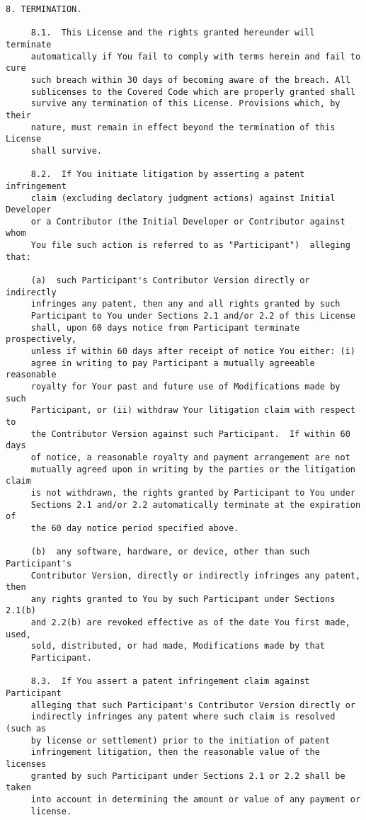 \begin{verbatim}
8. TERMINATION.

     8.1.  This License and the rights granted hereunder will terminate
     automatically if You fail to comply with terms herein and fail to cure
     such breach within 30 days of becoming aware of the breach. All
     sublicenses to the Covered Code which are properly granted shall
     survive any termination of this License. Provisions which, by their
     nature, must remain in effect beyond the termination of this License
     shall survive.

     8.2.  If You initiate litigation by asserting a patent infringement
     claim (excluding declatory judgment actions) against Initial Developer
     or a Contributor (the Initial Developer or Contributor against whom
     You file such action is referred to as "Participant")  alleging that:

     (a)  such Participant's Contributor Version directly or indirectly
     infringes any patent, then any and all rights granted by such
     Participant to You under Sections 2.1 and/or 2.2 of this License
     shall, upon 60 days notice from Participant terminate prospectively,
     unless if within 60 days after receipt of notice You either: (i)
     agree in writing to pay Participant a mutually agreeable reasonable
     royalty for Your past and future use of Modifications made by such
     Participant, or (ii) withdraw Your litigation claim with respect to
     the Contributor Version against such Participant.  If within 60 days
     of notice, a reasonable royalty and payment arrangement are not
     mutually agreed upon in writing by the parties or the litigation claim
     is not withdrawn, the rights granted by Participant to You under
     Sections 2.1 and/or 2.2 automatically terminate at the expiration of
     the 60 day notice period specified above.

     (b)  any software, hardware, or device, other than such Participant's
     Contributor Version, directly or indirectly infringes any patent, then
     any rights granted to You by such Participant under Sections 2.1(b)
     and 2.2(b) are revoked effective as of the date You first made, used,
     sold, distributed, or had made, Modifications made by that
     Participant.

     8.3.  If You assert a patent infringement claim against Participant
     alleging that such Participant's Contributor Version directly or
     indirectly infringes any patent where such claim is resolved (such as
     by license or settlement) prior to the initiation of patent
     infringement litigation, then the reasonable value of the licenses
     granted by such Participant under Sections 2.1 or 2.2 shall be taken
     into account in determining the amount or value of any payment or
     license.


\end{verbatim}
